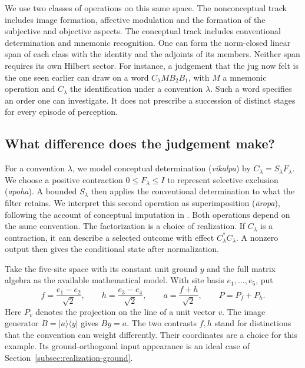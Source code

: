 \documentclass[11pt]{article}
\theoremstyle{definition}
\newcommand{\ket}[1]{\lvert #1\rangle}
\newcommand{\bra}[1]{\langle #1\rvert}
\begin{document}
We use two classes of operations on this same space. The nonconceptual track includes image formation, affective modulation and the formation of the subjective and objective aspects. The conceptual track includes conventional determination and mnemonic recognition. One can form the norm-closed linear span of each class with the identity and the adjoints of its members. Neither span requires its own Hilbert sector. For instance, a judgement that the jug now felt is the one seen earlier can draw on a word $C_\lambda M B_2 B_1$, with $M$ a mnemonic operation and $C_\lambda$ the identification under a convention $\lambda$. Such a word specifies an order one can investigate. It does not prescribe a succession of distinct stages for every episode of perception.

\subsection{What difference does the judgement make?}
\label{subsec:ordinary-judgement}

For a convention $\lambda$, we model conceptual determination (\emph{vikalpa}) by $C_\lambda=S_\lambda F_\lambda$. We choose a positive contraction $0\le F_\lambda\le I$ to represent selective exclusion (\emph{apoha}). A bounded $S_\lambda$ then applies the conventional determination to what the filter retains. We interpret this second operation as superimposition (\emph{\=aropa}), following the account of conceptual imputation in \cite[pp.~90--94]{Yiannopoulos2020}. Both operations depend on the same convention. The factorization is a choice of realization. If $C_\lambda$ is a contraction, it can describe a selected outcome with effect $C_\lambda^*C_\lambda$. A nonzero output then gives the conditional state after normalization.

Take the five-site space with its constant unit ground $y$ and the full matrix algebra as the available mathematical model. With site basis $e_1,\ldots,e_5$, put
\[
 f=\frac{e_1-e_2}{\sqrt2},\qquad h=\frac{e_3-e_4}{\sqrt2},\qquad
 a=\frac{f+h}{\sqrt2},\qquad P=P_f+P_h .
\]
Here $P_v$ denotes the projection on the line of a unit vector $v$. The image generator $B=\ket a\!\bra y$ gives $By=a$. The two contrasts $f,h$ stand for distinctions that the convention can weight differently. Their coordinates are a choice for this example. Its ground-orthogonal input appearance is an ideal case of Section~\ref{subsec:realization-ground}.
\end{document}
